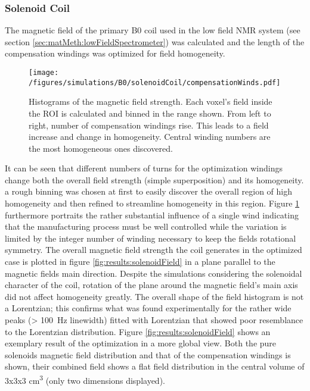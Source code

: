             \subsubsection{Solenoid Coil}
            \label{sec:results:B0solenoid}
            The magnetic field of the primary B0 coil used in the low field NMR system (see section \ref{sec:matMeth:lowFieldSpectrometer}) was calculated and the length of the compensation windings was optimized for field homogeneity.
                \begin{figure}
                    \centering
                    \texttt{[image: /figures/simulations/B0/solenoidCoil/compensationWinds.pdf]}
                    \caption[Compensation wind optimization]{Histograms of the magnetic field strength. Each voxel's field inside the ROI is calculated and binned in the range shown. From left to right, number of compensation windings rise. This leads to a field increase and change in homogeneity. Central winding numbers are the most homogeneous ones discovered.}
                    \label{fig:results:compensationWindOptimization}
                \end{figure}
            It can be seen that different numbers of turns for the optimization windings change both the overall field strength (simple superposition) and its homogeneity. a rough binning was chosen at first to easily discover the overall region of high homogeneity and then refined to streamline homogeneity in this region.
            Figure \ref{fig:results:compensationWindOptimization} furthermore portraits the rather substantial influence of a single wind indicating that the manufacturing process must be well controlled while the variation is limited by the integer number of winding necessary to keep the fields rotational symmetry.
            The  overall magnetic field strength the coil generates in the optimized case is plotted in figure \ref{fig:results:solenoidField} in a plane parallel to the magnetic fields main direction. Despite the simulations considering the solenoidal character of the coil, rotation of the plane around the magnetic field's main axis did not affect homogeneity greatly. The overall shape of the field histogram is not a Lorentzian; this confirms what was found experimentally for the rather wide peaks (> \SI{100}{\hertz} linewidth) fitted with Lorentzian that showed poor resemblance to the Lorentzian distribution. Figure \ref{fig:results:solenoidField} shows an exemplary result of the optimization in a more global view. Both the pure solenoids magnetic field distribution and that of the compensation windings is shown, their combined field shows a flat field distribution in the central volume of 3x3x3 \si{\cm\cubed} (only two dimensions displayed).
